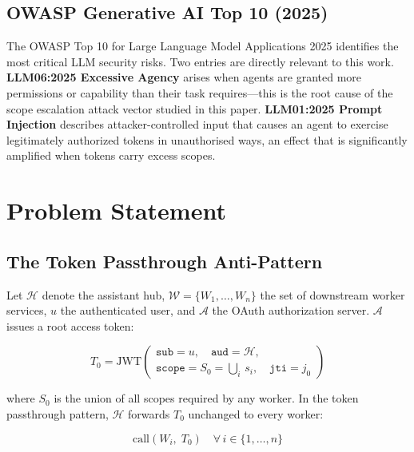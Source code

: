 \documentclass[journal]{IEEEtran}
\begin{document}
\subsection{OWASP Generative AI Top 10 (2025)}

The OWASP Top 10 for Large Language Model Applications 2025 \cite{owasp_genai}
identifies the most critical LLM security risks. Two entries are directly
relevant to this work. \textbf{LLM06:2025 Excessive Agency} arises when agents
are granted more permissions or capability than their task requires---this is the
root cause of the scope escalation attack vector studied in this paper.
\textbf{LLM01:2025 Prompt Injection} describes attacker-controlled input that
causes an agent to exercise legitimately authorized tokens in unauthorised ways,
an effect that is significantly amplified when tokens carry excess scopes.


\section{Problem Statement}
\label{sec:problem}

\subsection{The Token Passthrough Anti-Pattern}

Let $\mathcal{H}$ denote the assistant hub, $\mathcal{W}=\{W_1,\ldots,W_n\}$ the
set of downstream worker services, $u$ the authenticated user, and $\mathcal{A}$
the OAuth authorization server. $\mathcal{A}$ issues a root access token:

\begin{equation}
T_0 = \mathrm{JWT}\!\left(\begin{array}{l}
  \texttt{sub} = u,\quad \texttt{aud} = \mathcal{H},\\[2pt]
  \texttt{scope} = S_0 = \textstyle\bigcup_{i}\, s_i,\quad
  \texttt{jti} = j_0
\end{array}\right)
\label{eq:root}
\end{equation}

where $S_0$ is the union of all scopes required by any worker. In the token
passthrough pattern, $\mathcal{H}$ forwards $T_0$ unchanged to every worker:

\begin{equation}
\mathrm{call}(W_i,\; T_0) \quad \forall\, i \in \{1, \ldots, n\}
\label{eq:passthrough}
\end{equation}
\end{document}
